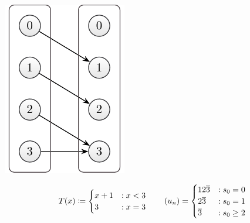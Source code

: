 \documentclass{stdlocal}
\begin{document}
    \medskip
    \begin{minipage}{0.2\textwidth}
      \includegraphics[width=\textwidth]{figures/periodicity_example_b.pdf}
    \end{minipage}
    \hfill
    \begin{minipage}{0.73\textwidth}
      \[
        T(x) \coloneqq
        \begin{cases}
          x + 1 &: x < 3 \\
          3 &: x = 3
        \end{cases}
      \qquad
        (u_n) =
        \begin{cases}
          12\overline{3} &: s_0 = 0 \\
          2\overline{3} &: s_0 = 1 \\
          \overline{3} &: s_0 \geq 2 \\
        \end{cases}
      \]
    \end{minipage}
    \medskip
\end{document}
